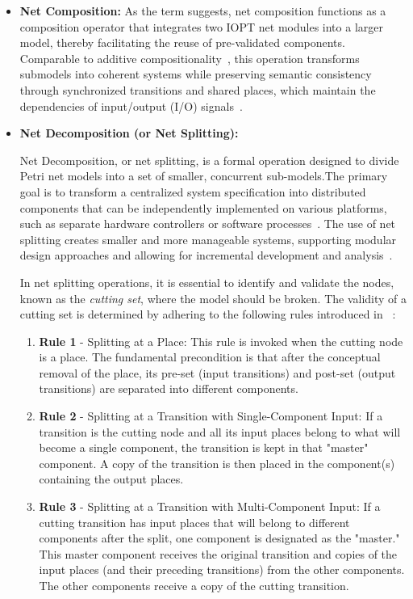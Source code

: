 \begin{itemize}
    \item \textbf{Net Composition: }     
As the term suggests, net composition functions as a composition operator that integrates two IOPT net modules into a larger model, thereby facilitating the reuse of pre-validated components. Comparable to additive compositionality~\cite{add2}, this operation transforms submodels into coherent systems while preserving semantic consistency through synchronized transitions and shared places, which maintain the dependencies of input/output (I/O) signals~\cite{add1}.
\end{itemize}

\begin{itemize}
    \item \textbf{Net Decomposition (or Net Splitting): }     
    
Net Decomposition, or net splitting,  is a formal operation designed to divide Petri net models into a set of smaller, concurrent sub-models.The primary goal is to transform a centralized system specification into distributed components that can be independently implemented on various platforms, such as separate hardware controllers or software processes~\cite{co-design}. The use of net splitting creates smaller and more manageable systems, supporting modular design approaches and allowing for incremental development and analysis~\cite{Barrosadd}.

In net splitting operations, it is essential to identify and validate the nodes, known as the \emph{cutting set}, where the model should be broken. The validity of a cutting set is determined by adhering to the following rules introduced in ~\cite{splitting}:

\begin{enumerate}
    \item \textbf{Rule 1} - Splitting at a Place: This rule is invoked when the cutting node is a place. The fundamental precondition is that after the conceptual removal of the place, its pre-set (input transitions) and post-set (output transitions) are separated into different components.
    \item \textbf{Rule 2} - Splitting at a Transition with Single-Component Input: If a transition is the cutting node and all its input places belong to what will become a single component, the transition is kept in that "master" component. A copy of the transition is then placed in the component(s) containing the output places.
    \item\textbf{ Rule 3} - Splitting at a Transition with Multi-Component Input: If a cutting transition has input places that will belong to different components after the split, one component is designated as the "master." This master component receives the original transition and copies of the input places (and their preceding transitions) from the other components. The other components receive a copy of the cutting transition.
\end{enumerate}


\end{itemize}
